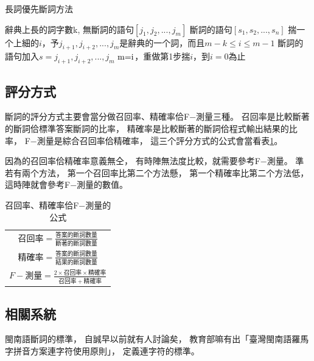 
\begin{algorithm}
  \caption{長詞優先斷詞方法}
  \label{方法：長詞優先斷詞方法}
  \begin{algorithmic}
    \REQUIRE 辭典上長的詞字數k, 無斷詞的語句$[j_{1}, j_{2}, ... , j_{m}]$
    \ENSURE 斷詞的語句$[s_{1}, s_{2}, ... , s_{n}]$
    \STATE 揣一个上細的\(i\)，予\(j_{i+1}, j_{i+2}, ... , j_{m}\)是辭典的一个詞，而且\(m − k \leq i \leq m − 1\)
    \STATE 斷詞的語句加入\(s=j_{i+1}, j_{i+2}, ... , j_{m}\)
    \STATE \( $m=i$ \)，重做第1步揣\(i\)，到\(i=0\)為止
  \end{algorithmic}
\end{algorithm}

\subsection{評分方式}
\label{小節：斷詞評分方式}
斷詞的評分方式主要會當分做召回率、精確率佮F−測量三種\cite{ChineseNLP}。
召回率是比較斷著的斷詞佮標準答案斷詞的比率，
精確率是比較斷著的斷詞佮程式輸出結果的比率，
F−測量是綜合召回率佮精確率，
這三个評分方式的公式會當看表\ref{表：召回率、精確率佮F−測量的公式}。

因為的召回率佮精確率意義無仝，
有時陣無法度比較，就需要參考F−測量。
準若有兩个方法，
第一个召回率比第二个方法懸，
第一个精確率比第二个方法低，
這時陣就會參考F−測量的數值。

\begin{table}
\caption{召回率、精確率佮F−測量的公式}
\label{表：召回率、精確率佮F−測量的公式}
\centering
\begin{tabular}{c}
$召回率=\frac{答案的斷詞數量}{斷著的斷詞數量}$\\
$精確率=\frac{答案的斷詞數量}{結果的斷詞數量}$\\
$F−測量=\frac{2×召回率×精確率}{召回率+精確率}$\\
\end{tabular}
\end{table}

\subsection{相關系統}
\label{小節：斷詞相關系統}
閩南語斷詞的標準，
自誠早以前就有人討論矣\cite{台語斷詞原則討論}，
教育部嘛有出「臺灣閩南語羅馬字拼音方案連字符使用原則」\cite{臺羅拼音}，
定義連字符的標準。

